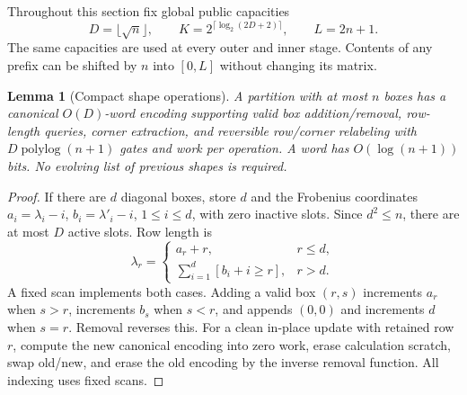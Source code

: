 \documentclass[11pt]{article}
\newtheorem{lemma}[theorem]{Lemma}
\theoremstyle{definition}
\newcommand{\polylog}{\operatorname{polylog}}
\begin{document}
Throughout this section fix global public capacities
\[
 D=\lfloor\sqrt n\rfloor,\qquad
 K=2^{\lceil\log_2(2D+2)\rceil},\qquad L=2n+1.
\]
The same capacities are used at every outer and inner stage. Contents of
any prefix can be shifted by $n$ into $[0,L]$ without changing its matrix.

\begin{lemma}[Compact shape operations]\label{lem:shape}
A partition with at most $n$ boxes has a canonical $O(D)$-word encoding
supporting valid box addition/removal, row-length queries, corner
extraction, and reversible row/corner relabeling with
$D\polylog(n+1)$ gates and work per operation. A word has
$O(\log(n+1))$ bits. No evolving list of previous shapes is required.
\end{lemma}
\begin{proof}
If there are $d$ diagonal boxes, store $d$ and the Frobenius coordinates
$a_i=\lambda_i-i$, $b_i=\lambda'_i-i$, $1\le i\le d$, with zero inactive
slots. Since $d^2\le n$, there are at most $D$ active slots. Row length is
\[
 \lambda_r=\begin{cases}
 a_r+r,&r\le d,\\
 \sum_{i=1}^{d}[b_i+i\ge r],&r>d.
 \end{cases}
\]
A fixed scan implements both cases. Adding a valid box $(r,s)$ increments
$a_r$ when $s>r$, increments $b_s$ when $s<r$, and appends $(0,0)$ and
increments $d$ when $s=r$. Removal reverses this. For a clean in-place
update with retained row $r$, compute the new canonical encoding into
zero work, erase calculation scratch, swap old/new, and erase the old
encoding by the inverse removal function. All indexing uses fixed scans.


\end{proof}
\end{document}
